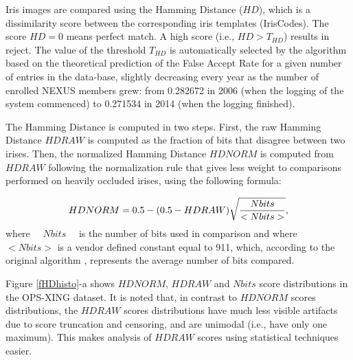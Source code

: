\documentclass{cta-author}%
\begin{document}
Iris images are compared using the Hamming Distance ($HD$), which is a dissimilarity score between the corresponding  iris templates (IrisCodes). 
The score $HD=0$ means perfect match.  A high score (i.e., $HD >T_{HD}$) results in reject. The value of the threshold $T_{HD}$ is automatically selected by the algorithm based on the theoretical prediction of the False Accept Rate for a given number of entries in the data-base, slightly decreasing every year as the number of enrolled NEXUS members grew: from 0.282672 in 2006 (when the logging of the system commenced) to 0.271534 in 2014 (when the logging finished).

The Hamming Distance is computed in two steps.
First, the raw Hamming Distance $HDRAW$ is computed as the fraction of bits that disagree between two irises.
Then, the normalized Hamming Distance $HDNORM$ is computed from $HDRAW$ following the normalization rule that gives less weight to comparisons performed on heavily occluded irises, using the following formula:

\begin{equation}
HDNORM = 0.5-(0.5-HDRAW)\sqrt{  Nbits \over <Nbits>},  
\label{EQN}
\end{equation}
where ~~$Nbits$~~ is  the number of bits used in comparison  
and where~~
$<Nbits>$ is a vendor defined constant equal to 911, which, according to the original algorithm \cite{Daugman2006}, represents the average number of bits compared. 


Figure \ref{fHDhisto}-a  shows  $HDNORM$, $HDRAW$ and $Nbits$ score distributions in the OPS-XING dataset.
It is noted that, in contrast to   $HDNORM$ scores distributions, the $HDRAW$ scores distributions 
have much less visible artifacts
due to score truncation and censoring, and are unimodal (i.e., have only one maximum). This makes analysis of  $HDRAW$ scores using statistical techniques easier.
\end{document}
